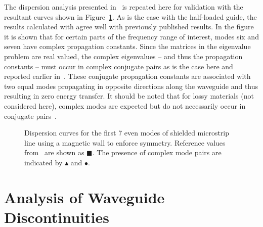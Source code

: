 The dispersion analysis presented in~\cite{PelCoc1998} is repeated
here for validation with the resultant curves shown in
Figure~\ref{fig:shielded_microstrip_dispersion_curves}. As is the case
with the half-loaded guide, the results calculated with \fenics{}
agree well with previously published results. In the figure it is
shown that for certain parts of the frequency range of interest, modes
six and seven have complex propagation constants. Since the matrices
in the eigenvalue problem are real valued, the complex eigenvalues --
and thus the propagation constants -- must occur in complex conjugate
pairs as is the case here and reported earlier
in~\cite{HuaIto1988}. These conjugate propagation constants are
associated with two equal modes propagating in opposite directions
along the waveguide and thus resulting in zero energy transfer. It
should be noted that for lossy materials (not considered here),
complex modes are expected but do not necessarily occur in conjugate
pairs~\cite{PelCoc1998}.
\begin{figure}[h]
 \centering
 \caption{Dispersion curves for the first 7 even modes of shielded microstrip line using a magnetic wall to enforce symmetry.  Reference values from~\cite{PelCoc1998} are shown as $\blacksquare$.  The presence of complex mode pairs are indicated by $\blacktriangle$ and $\bullet$.}
 \label{fig:shielded_microstrip_dispersion_curves}
\end{figure}
\label{sec:shielded_microstrip|)}
\section{Analysis of Waveguide Discontinuities}
\label{sec:waveguide_discontinuities}

